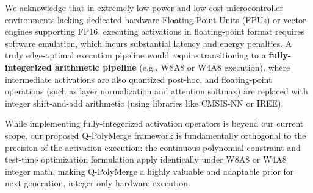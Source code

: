 We acknowledge that in extremely low-power and low-cost microcontroller environments lacking dedicated hardware Floating-Point Units (FPUs) or vector engines supporting FP16, executing activations in floating-point format requires software emulation, which incurs substantial latency and energy penalties. A truly edge-optimal execution pipeline would require transitioning to a \textbf{fully-integerized arithmetic pipeline} (e.g., W8A8 or W4A8 execution), where intermediate activations are also quantized post-hoc, and floating-point operations (such as layer normalization and attention softmax) are replaced with integer shift-and-add arithmetic (using libraries like CMSIS-NN or IREE). 

While implementing fully-integerized activation operators is beyond our current scope, our proposed Q-PolyMerge framework is fundamentally orthogonal to the precision of the activation execution: the continuous polynomial constraint and test-time optimization formulation apply identically under W8A8 or W4A8 integer math, making Q-PolyMerge a highly valuable and adaptable prior for next-generation, integer-only hardware execution.
